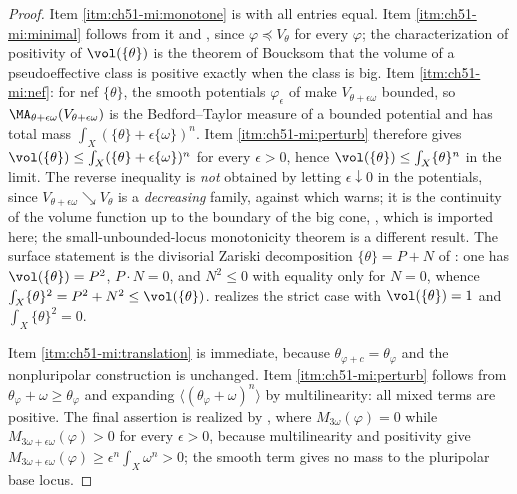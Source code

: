 \begin{proof}
Item \cref{itm:ch51-mi:monotone} is
 with all entries equal.  Item
\cref{itm:ch51-mi:minimal} follows from it and
, since $\varphi\preceq V_\theta$
for every $\varphi$; the characterization of positivity of
$\vol(\{\theta\})$ is the theorem of Boucksom
\cite{Bou02,Bou02b} that the volume of a pseudoeffective class is
positive exactly when the class is big.  Item \cref{itm:ch51-mi:nef}: for
nef $\{\theta\}$, the smooth potentials $\varphi_\epsilon$ of
 make $V_{\theta+\epsilon\omega}$ bounded, so
$\MA_{\theta+\epsilon\omega}(V_{\theta+\epsilon\omega})$ is the
Bedford--Taylor measure of a bounded potential and has total mass
$\int_X(\{\theta\}+\epsilon\{\omega\})^n$.  Item
\cref{itm:ch51-mi:perturb} therefore gives
$\vol(\{\theta\})\leq\int_X(\{\theta\}+\epsilon\{\omega\})^n$ for every
$\epsilon>0$, hence $\vol(\{\theta\})\leq\int_X\{\theta\}^n$ in the
limit.  The reverse inequality is \emph{not} obtained by letting
$\epsilon\downarrow0$ in the potentials, since
$V_{\theta+\epsilon\omega}\searrow V_\theta$ is a \emph{decreasing}
family, against which  warns; it is the
continuity of the volume function up to the boundary of the big cone,
\cite{Bou02}, which is imported here; the small-unbounded-locus
monotonicity theorem \cite[Theorem~1.16]{BEGZ10} is a different result.  The surface statement is the
divisorial Zariski decomposition $\{\theta\}=P+N$ of \cite{Bou04}: one
has $\vol(\{\theta\})=P^2$, $P\cdot N=0$, and $N^2\leq0$ with
equality only for $N=0$, whence
$\int_X\{\theta\}^2=P^2+N^2\leq\vol(\{\theta\})$.
 realizes the strict case with
$\vol(\{\theta\})=1$ and $\int_X\{\theta\}^2=0$.

Item \cref{itm:ch51-mi:translation} is immediate, because
$\theta_{\varphi+c}=\theta_\varphi$ and the nonpluripolar construction
is unchanged.  Item \cref{itm:ch51-mi:perturb} follows from
$\theta_\varphi+\omega\geq\theta_\varphi$ and expanding
$\langle(\theta_\varphi+\omega)^n\rangle$ by multilinearity: all mixed
terms are positive.  The final assertion is realized by
, where $M_{3\omega}(\varphi)=0$ while
$M_{3\omega+\epsilon\omega}(\varphi)>0$ for every $\epsilon>0$,
because multilinearity and positivity give
$M_{3\omega+\epsilon\omega}(\varphi)\geq
\epsilon^n\int_X\omega^n>0$; the smooth term gives no mass to the
pluripolar base locus.
\end{proof}

